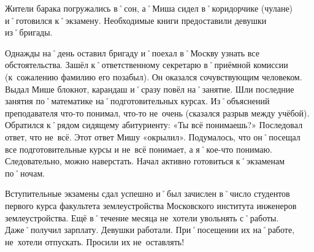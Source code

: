 Жители барака погружались в˚сон, а˚Миша сидел в˚коридорчике (чулане)  и˚готовился к˚экзамену. Необходимые книги предоставили девушки из˚бригады.

Однажды на˚день оставил бригаду и˚поехал в˚Москву узнать все обстоятельства. Зашёл к˚ответственному секретарю в˚приёмной комиссии (к~сожалению фамилию его позабыл). Он оказался сочувствующим человеком. Выдал Мише блокнот, карандаш и˚сразу повёл на˚занятие. Шли последние занятия по˚математике на˚подготовительных курсах. Из˚объяснений преподавателя что-то понимал, что-то не~очень (сказался разрыв между учёбой). Обратился к˚рядом сидящему абитуриенту: «Ты всё понимаешь?» Последовал ответ, что не~всё. Этот ответ Мишу «окрылил». Подумалось, что он˚посещал все подготовительные курсы и не~всё понимает, а я˚кое-что понимаю. Следовательно, можно наверстать. Начал активно готовиться к˚экзаменам по˚ночам.

Вступительные экзамены сдал успешно и˚был зачислен в˚число студентов первого курса факультета землеустройства Московского института инженеров землеустройства. Ещё в˚течение месяца не~хотели увольнять с˚работы. Даже˚получил зарплату. Девушки работали. При˚посещении их на˚работе, не~хотели отпускать. Просили их не~оставлять!